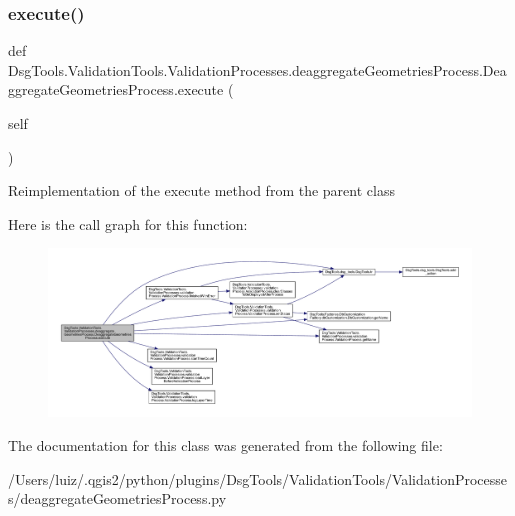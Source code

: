 \subsubsection{\texorpdfstring{execute()}{execute()}}
{\footnotesize\ttfamily def Dsg\+Tools.\+Validation\+Tools.\+Validation\+Processes.\+deaggregate\+Geometries\+Process.\+Deaggregate\+Geometries\+Process.\+execute (\begin{DoxyParamCaption}\item[{}]{self }\end{DoxyParamCaption})}

\begin{DoxyVerb}Reimplementation of the execute method from the parent class
\end{DoxyVerb}
 Here is the call graph for this function\+:
\nopagebreak
\begin{figure}[H]
\begin{center}
\leavevmode
\includegraphics[width=350pt]{class_dsg_tools_1_1_validation_tools_1_1_validation_processes_1_1deaggregate_geometries_process_f80917ef3b04cd8dc841b918110d01db_adf0b20ea240f41fe1477e52cc0b5f421_cgraph}
\end{center}
\end{figure}


The documentation for this class was generated from the following file\+:\begin{DoxyCompactItemize}
\item 
/\+Users/luiz/.\+qgis2/python/plugins/\+Dsg\+Tools/\+Validation\+Tools/\+Validation\+Processes/deaggregate\+Geometries\+Process.\+py\end{DoxyCompactItemize}
